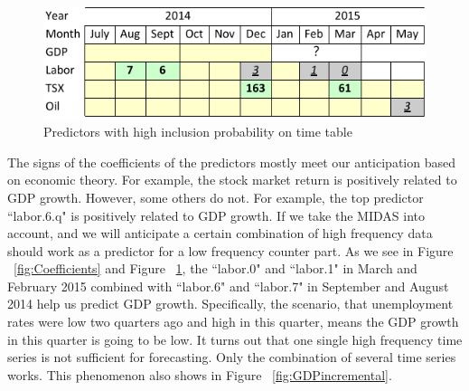 \begin{figure}[ht]
	\centering
	\includegraphics[width=1\linewidth]{Figures/MonthQuarterYear}
	\caption{Predictors with high inclusion probability on time table}
	\label{fig:MonthQuarterYear}
\end{figure}


The signs of the coefficients of the predictors mostly meet our anticipation based on economic theory. For example, the stock market return is positively related to GDP growth. However, some others do not. For example, the top predictor ``labor.6.q" is positively related to GDP growth. If we take the MIDAS into account, and we will anticipate a certain combination of high frequency data should work as a predictor for a low frequency counter part. As we see in Figure ~\ref{fig:Coefficients} and Figure ~\ref{fig:MonthQuarterYear}, the ``labor.0" and ``labor.1" in March and February 2015 combined with ``labor.6" and ``labor.7" in September and August 2014 help us predict GDP growth. Specifically, the scenario, that  unemployment rates were low two quarters ago and high in this quarter, means the GDP growth in this quarter is going to be low. 
It turns out that one single high frequency time series is not sufficient for forecasting. Only the combination of several time series works. This phenomenon also shows in Figure ~\ref{fig:GDPincremental}. 


